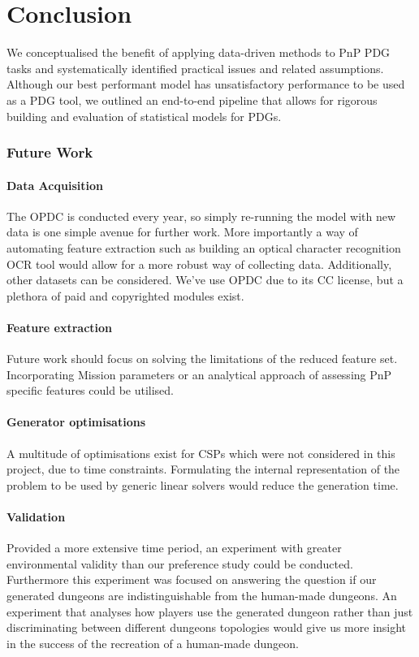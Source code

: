 \documentclass{UoYCSproject}
\begin{document}
\chapter{Conclusion}
\label{cha:conclusion}
We conceptualised the benefit of applying data-driven methods to PnP PDG tasks and systematically identified practical issues and related assumptions. Although our best performant model has unsatisfactory performance to be used as a PDG tool, we outlined an end-to-end pipeline that allows for rigorous building and evaluation of statistical models for PDGs. 

\subsection{Future Work}

\subsubsection{Data Acquisition}
The OPDC is conducted every year, so simply re-running the model with new data is one simple avenue for further work. More importantly a way of automating feature extraction such as building an optical character recognition OCR tool would allow for a more robust way of collecting data. Additionally, other datasets can be considered. We've use OPDC due to its CC license, but a plethora of paid and copyrighted modules exist.

\subsubsection{Feature extraction}
Future work should focus on solving the limitations of the reduced feature set. Incorporating Mission parameters or an analytical approach of assessing PnP specific features could be utilised.

\subsubsection{Generator optimisations}
A multitude of optimisations exist for CSPs which were not considered in this project, due to time constraints. Formulating the internal representation of the problem to be used by generic linear solvers would reduce the generation time.

\subsubsection{Validation}
Provided a more extensive time period, an experiment with greater environmental validity than our preference study could be conducted.
Furthermore this experiment was focused on answering the question if our generated dungeons are indistinguishable from the human-made dungeons. An experiment that analyses how players use the generated dungeon rather than just discriminating between different dungeons topologies would give us more insight in the success of the recreation of a human-made dungeon.
\end{document}
